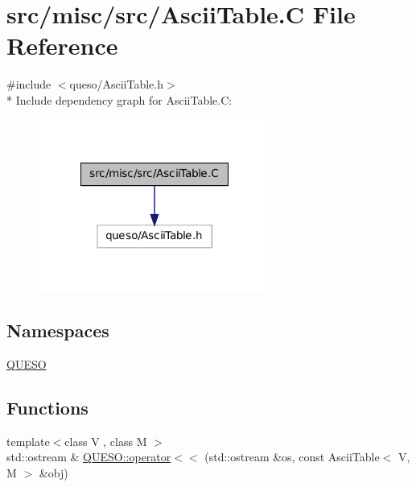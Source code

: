 \hypertarget{_ascii_table_8_c}{\section{src/misc/src/\-Ascii\-Table.C File Reference}
\label{_ascii_table_8_c}
}
{\ttfamily \#include $<$queso/\-Ascii\-Table.\-h$>$}\\*
Include dependency graph for Ascii\-Table.\-C\-:
\nopagebreak
\begin{figure}[H]
\begin{center}
\leavevmode
\includegraphics[width=216pt]{_ascii_table_8_c__incl}
\end{center}
\end{figure}
\subsection*{Namespaces}
\begin{DoxyCompactItemize}
\item 
\hyperlink{namespace_q_u_e_s_o}{Q\-U\-E\-S\-O}
\end{DoxyCompactItemize}
\subsection*{Functions}
\begin{DoxyCompactItemize}
\item 
{\footnotesize template$<$class V , class M $>$ }\\std\-::ostream \& \hyperlink{namespace_q_u_e_s_o_abd30e6a15a8d9117611fddd7d06c3eed}{Q\-U\-E\-S\-O\-::operator$<$$<$} (std\-::ostream \&os, const Ascii\-Table$<$ V, M $>$ \&obj)
\end{DoxyCompactItemize}
